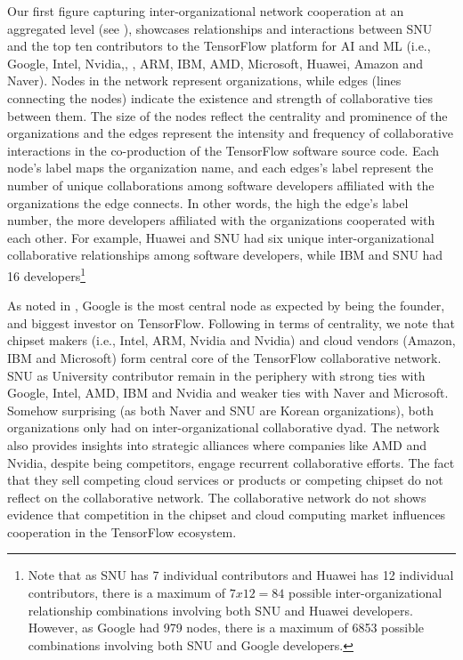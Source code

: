 \documentclass[CHICAGO,Times1COL]{WileyNJDv5} %
\begin{document}
Our first figure capturing  inter-organizational network cooperation at an aggregated level (see ), showcases relationships and interactions between SNU and the top ten contributors to the TensorFlow platform for \ac{AI} and \ac{ML} (i.e., Google, Intel, Nvidia,, , ARM, IBM, AMD, Microsoft, Huawei, Amazon and Naver).
Nodes in the network represent organizations, while edges (lines connecting the nodes) indicate the existence and strength of collaborative ties between them. The size of the nodes reflect the centrality and prominence of the organizations and the edges  represent the intensity and  frequency of collaborative interactions in the co-production of the TensorFlow  software source code. Each node's label maps the organization name, and each edges's label represent the number of unique collaborations among software developers affiliated with the organizations the edge connects. In other words, the high the edge's label number, the more developers affiliated with the organizations cooperated with each other. For example, Huawei and SNU had six unique inter-organizational collaborative relationships among software developers, while IBM and SNU had 16 developers\footnote{Note that as SNU has 7 individual contributors and Huawei has 12 individual contributors, there is a maximum of $7x12=84$ possible inter-organizational relationship combinations involving both SNU and Huawei developers. However, as Google had  979 nodes,  there is a maximum of 6853 possible combinations involving both SNU and Google developers.}


As noted in , Google is the most central node as expected by being the founder, and biggest investor on TensorFlow. Following in terms of centrality, we note that chipset makers (i.e., Intel, ARM, Nvidia and Nvidia) and cloud vendors (Amazon, IBM and Microsoft) form central core of the TensorFlow collaborative network. SNU as University contributor remain in the periphery with strong ties with Google, Intel, AMD, IBM and Nvidia and weaker ties with Naver and Microsoft.  Somehow surprising (as both Naver and SNU are Korean organizations), both organizations only had on inter-organizational collaborative dyad.  The network also provides insights into strategic alliances where companies like AMD and Nvidia, despite being competitors, engage recurrent collaborative efforts. The fact that they sell competing cloud services or products or competing chipset do not reflect on the collaborative network. The collaborative network do not shows evidence that competition in the chipset and cloud computing market influences cooperation in the TensorFlow ecosystem. 
\end{document}
